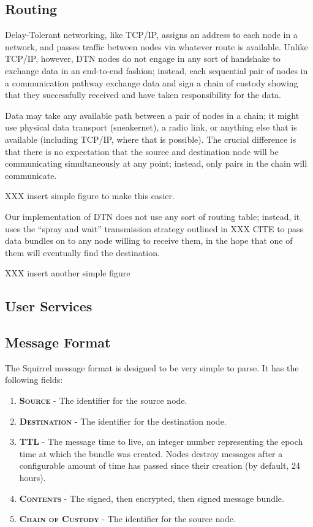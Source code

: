 \documentclass[12pt]{article}
\begin{document}
  \subsection{Routing}
  
    Delay-Tolerant networking, like TCP/IP, assigns an address to each node in a network, and passes traffic between nodes via whatever route is available. Unlike TCP/IP, however, DTN nodes do not engage in any sort of handshake to exchange data in an end-to-end fashion; instead, each sequential pair of nodes in a communication pathway exchange data and sign a chain of custody showing that they successfully received and have taken responsibility for the data.
    
    Data may take any available path between a pair of nodes in a chain; it might use physical data transport (sneakernet), a radio link, or anything else that is available (including TCP/IP, where that is possible). The crucial difference is that there is no expectation that the source and destination node will be communicating simultaneously at any point; instead, only pairs in the chain will communicate.
    
    XXX insert simple figure to make this easier.
    
    Our implementation of DTN does not use any sort of routing table; instead, it uses the ``spray and wait'' transmission strategy outlined in XXX CITE to pass data bundles on to any node willing to receive them, in the hope that one of them will eventually find the destination.
    
    XXX insert another simple figure
    
  \subsection{User Services}
  
  \subsection{Message Format}
  
  The Squirrel message format is designed to be very simple to parse. It has the following fields:
  
  \begin{enumerate}
    \item \textbf{\textsc{Source}} - The identifier for the source node.
    \item \textbf{\textsc{Destination}} - The identifier for the destination node.
    \item \textbf{\textsc{TTL}} - The message time to live, an integer number representing the epoch time at which the bundle was created. Nodes destroy messages after a configurable amount of time has passed since their creation (by default, 24 hours).
    \item \textbf{\textsc{Contents}} - The signed, then encrypted, then signed message bundle.
    \item \textbf{\textsc{Chain of Custody}} - The identifier for the source node.

    \end{enumerate}
    
\end{document}
